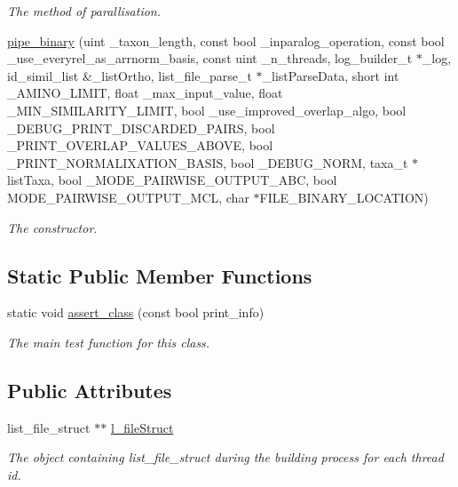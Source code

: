 \begin{DoxyCompactItemize}
\begin{DoxyCompactList}\small\item\em The method of parallisation. \end{DoxyCompactList}\item 
\hypertarget{classpipe__binary_a033e68ff8b21f23203533140ffacd33c}{
\hyperlink{classpipe__binary_a033e68ff8b21f23203533140ffacd33c}{pipe\_\-binary} (uint \_\-taxon\_\-length, const bool \_\-inparalog\_\-operation, const bool \_\-use\_\-everyrel\_\-as\_\-arrnorm\_\-basis, const uint \_\-n\_\-threads, log\_\-builder\_\-t $\ast$\_\-log, id\_\-simil\_\-list \&\_\-listOrtho, list\_\-file\_\-parse\_\-t $\ast$\_\-listParseData, short int \_\-AMINO\_\-LIMIT, float \_\-max\_\-input\_\-value, float \_\-MIN\_\-SIMILARITY\_\-LIMIT, bool \_\-use\_\-improved\_\-overlap\_\-algo, bool \_\-DEBUG\_\-PRINT\_\-DISCARDED\_\-PAIRS, bool \_\-PRINT\_\-OVERLAP\_\-VALUES\_\-ABOVE, bool \_\-PRINT\_\-NORMALIXATION\_\-BASIS, bool \_\-DEBUG\_\-NORM, taxa\_\-t $\ast$listTaxa, bool \_\-MODE\_\-PAIRWISE\_\-OUTPUT\_\-ABC, bool MODE\_\-PAIRWISE\_\-OUTPUT\_\-MCL, char $\ast$FILE\_\-BINARY\_\-LOCATION)}
\label{classpipe__binary_a033e68ff8b21f23203533140ffacd33c}

\begin{DoxyCompactList}\small\item\em The constructor. \end{DoxyCompactList}\end{DoxyCompactItemize}
\subsection*{Static Public Member Functions}
\begin{DoxyCompactItemize}
\item 
\hypertarget{classpipe__binary_aed0b59ca4fcd5f76f2e5ba98cf0b8fa2}{
static void \hyperlink{classpipe__binary_aed0b59ca4fcd5f76f2e5ba98cf0b8fa2}{assert\_\-class} (const bool print\_\-info)}
\label{classpipe__binary_aed0b59ca4fcd5f76f2e5ba98cf0b8fa2}

\begin{DoxyCompactList}\small\item\em The main test function for this class. \end{DoxyCompactList}\end{DoxyCompactItemize}
\subsection*{Public Attributes}
\begin{DoxyCompactItemize}
\item 
\hypertarget{classpipe__binary_a98aae9d6173bdce587b78011d54fc432}{
list\_\-file\_\-struct $\ast$$\ast$ \hyperlink{classpipe__binary_a98aae9d6173bdce587b78011d54fc432}{l\_\-fileStruct}}
\label{classpipe__binary_a98aae9d6173bdce587b78011d54fc432}

\begin{DoxyCompactList}\small\item\em The object containing list\_\-file\_\-struct during the building process for each thread id. \end{DoxyCompactList}\end{DoxyCompactItemize}


